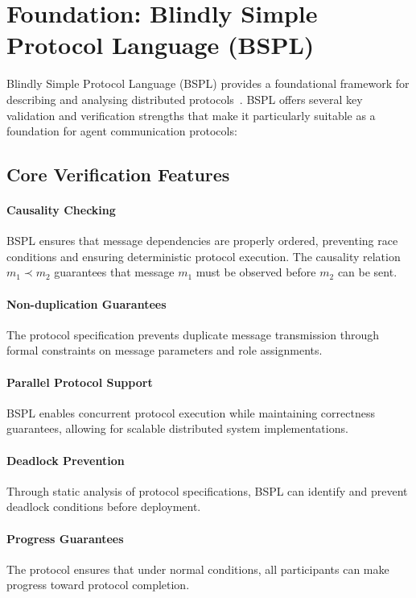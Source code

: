 \documentclass[11pt,a4paper]{article}
\begin{document}
	\section{Foundation: Blindly Simple Protocol Language (BSPL)}
	\label{sec:background}
	
	Blindly Simple Protocol Language (BSPL) provides a foundational framework for describing and analysing distributed protocols~\cite{bspl-aamas}. BSPL offers several key validation and verification strengths that make it particularly suitable as a foundation for agent communication protocols:
	
	\subsection{Core Verification Features}
	\label{subsec:core-verification}
	
	\paragraph{Causality Checking} BSPL ensures that message dependencies are properly ordered, preventing race conditions and ensuring deterministic protocol execution. The causality relation $m_1 \prec m_2$ guarantees that message $m_1$ must be observed before $m_2$ can be sent.
	
	\paragraph{Non-duplication Guarantees} The protocol specification prevents duplicate message transmission through formal constraints on message parameters and role assignments.
	
	\paragraph{Parallel Protocol Support} BSPL enables concurrent protocol execution while maintaining correctness guarantees, allowing for scalable distributed system implementations.
	
	\paragraph{Deadlock Prevention} Through static analysis of protocol specifications, BSPL can identify and prevent deadlock conditions before deployment.
	
	\paragraph{Progress Guarantees} The protocol ensures that under normal conditions, all participants can make progress toward protocol completion.
	
\end{document}
